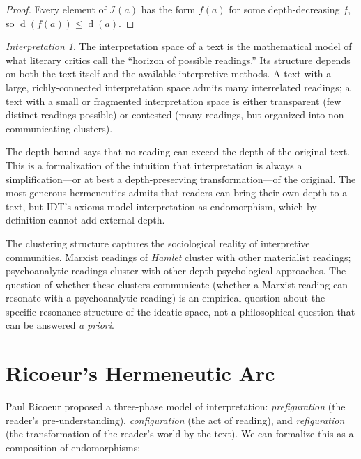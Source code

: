 \documentclass[11pt,openany]{book}
\theoremstyle{definition}
\theoremstyle{plain}
\theoremstyle{remark}
\newtheorem{interpretation}[axiom]{Interpretation}
\newcommand{\depth}{\operatorname{d}}       %
\begin{document}
\begin{proof}
Every element of $\mathcal{I}(a)$ has the form $f(a)$ for some depth-decreasing $f$, so $\depth(f(a)) \leq \depth(a)$.
\end{proof}

\begin{interpretation}
The interpretation space of a text is the mathematical model of what literary critics call the ``horizon of possible readings.'' Its structure depends on both the text itself and the available interpretive methods. A text with a large, richly-connected interpretation space admits many interrelated readings; a text with a small or fragmented interpretation space is either transparent (few distinct readings possible) or contested (many readings, but organized into non-communicating clusters).

The depth bound says that no reading can exceed the depth of the original text. This is a formalization of the intuition that interpretation is always a simplification---or at best a depth-preserving transformation---of the original. The most generous hermeneutics admits that readers can bring their own depth to a text, but IDT's axioms model interpretation as endomorphism, which by definition cannot add external depth.

The clustering structure captures the sociological reality of interpretive communities. Marxist readings of \emph{Hamlet} cluster with other materialist readings; psychoanalytic readings cluster with other depth-psychological approaches. The question of whether these clusters communicate (whether a Marxist reading can resonate with a psychoanalytic reading) is an empirical question about the specific resonance structure of the ideatic space, not a philosophical question that can be answered \textit{a priori}.
\end{interpretation}

\section{Ricoeur's Hermeneutic Arc}

Paul Ricoeur proposed a three-phase model of interpretation: \emph{prefiguration} (the reader's pre-understanding), \emph{configuration} (the act of reading), and \emph{refiguration} (the transformation of the reader's world by the text). We can formalize this as a composition of endomorphisms:
\end{document}
